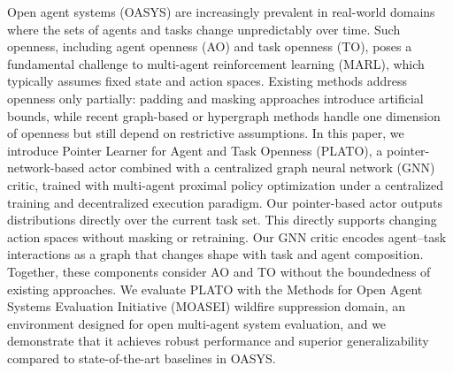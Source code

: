 Open agent systems (OASYS) are increasingly prevalent in real-world domains where the sets of agents and tasks change unpredictably over time. Such openness, including agent openness (AO) and task openness (TO), poses a fundamental challenge to multi-agent reinforcement learning (MARL), which typically assumes fixed state and action spaces. Existing methods address openness only partially: padding and masking approaches introduce artificial bounds, while recent graph-based or hypergraph methods handle one dimension of openness but still depend on restrictive assumptions. In this paper, we introduce Pointer Learner for Agent and Task Openness (PLATO), a pointer-network-based actor combined with a centralized graph neural network (GNN) critic, trained with multi-agent proximal policy optimization under a centralized training and decentralized execution paradigm. Our pointer-based actor outputs distributions directly over the current task set. This directly supports changing action spaces without masking or retraining. Our GNN critic encodes agent–task interactions as a graph that changes shape with task and agent composition. Together, these components consider AO and TO without the boundedness of existing approaches. We evaluate PLATO with the Methods for Open Agent Systems Evaluation Initiative (MOASEI) wildfire suppression domain, an environment designed for open multi-agent system evaluation, and we demonstrate that it achieves robust performance and superior generalizability compared to state-of-the-art baselines in OASYS. 
